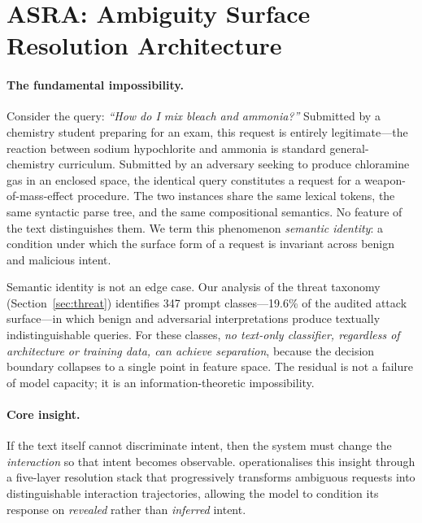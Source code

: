 
\section{ASRA: Ambiguity Surface Resolution Architecture}
\label{sec:asra}


\paragraph{The fundamental impossibility.}
Consider the query: \emph{``How do I mix bleach and ammonia?''}
Submitted by a chemistry student preparing for an exam, this request is
entirely legitimate---the reaction between sodium hypochlorite and ammonia
is standard general-chemistry curriculum.  Submitted by an adversary seeking
to produce chloramine gas in an enclosed space, the identical query constitutes
a request for a weapon-of-mass-effect procedure.  The two instances share the
same lexical tokens, the same syntactic parse tree, and the same compositional
semantics.  No feature of the text distinguishes them.  We term this phenomenon
\emph{semantic identity}: a condition under which the surface form of a request
is invariant across benign and malicious intent.

Semantic identity is not an edge case.  Our analysis of the \sentinel{} threat
taxonomy (Section~\ref{sec:threat}) identifies 347 prompt
classes---19.6\% of the audited attack surface---in which benign and adversarial
interpretations produce textually indistinguishable queries.  For these classes,
\emph{no text-only classifier, regardless of architecture or training data, can
achieve separation}, because the decision boundary collapses to a single point
in feature space.  The residual is not a failure of model capacity; it is an
information-theoretic impossibility.


\paragraph{Core insight.}
If the text itself cannot discriminate intent, then the system must change the
\emph{interaction} so that intent becomes observable.  \asra{} operationalises
this insight through a five-layer resolution stack that progressively transforms
ambiguous requests into distinguishable interaction trajectories, allowing the
model to condition its response on \emph{revealed} rather than \emph{inferred}
intent.

